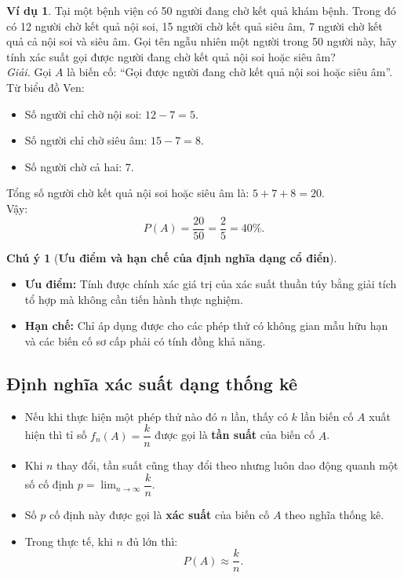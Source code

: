 \documentclass[12pt,a4paper]{article}
\theoremstyle{definition}
\newtheorem{vidu}{Ví dụ}[section]
\newtheorem{chuy}{Chú ý}[section]
\begin{document}
\begin{vidu}
Tại một bệnh viện có 50 người đang chờ kết quả khám bệnh. Trong đó có 12 người chờ kết quả nội soi, 15 người chờ kết quả siêu âm, 7 người chờ kết quả cả nội soi và siêu âm. Gọi tên ngẫu nhiên một người trong 50 người này, hãy tính xác suất gọi được người đang chờ kết quả nội soi hoặc siêu âm?\\
\textit{Giải.} Gọi $A$ là biến cố: ``Gọi được người đang chờ kết quả nội soi hoặc siêu âm''.
Từ biểu đồ Ven:
\begin{itemize}
    \item Số người chỉ chờ nội soi: $12 - 7 = 5$.
    \item Số người chỉ chờ siêu âm: $15 - 7 = 8$.
    \item Số người chờ cả hai: $7$.
\end{itemize}
Tổng số người chờ kết quả nội soi hoặc siêu âm là: $5 + 7 + 8 = 20$.\\
Vậy:
\[
P(A) = \frac{20}{50} = \frac{2}{5} = 40\%.
\]
\end{vidu}

\begin{chuy}[\textbf{Ưu điểm và hạn chế của định nghĩa dạng cổ điển}]
\begin{itemize}
    \item \textbf{Ưu điểm:} Tính được chính xác giá trị của xác suất thuần túy bằng giải tích tổ hợp mà không cần tiến hành thực nghiệm.
    \item \textbf{Hạn chế:} Chỉ áp dụng được cho các phép thử có không gian mẫu hữu hạn và các biến cố sơ cấp phải có tính đồng khả năng.
\end{itemize}
\end{chuy}

\subsection{Định nghĩa xác suất dạng thống kê}
\begin{itemize}[leftmargin=1.5em]
    \item Nếu khi thực hiện một phép thử nào đó $n$ lần, thấy có $k$ lần biến cố $A$ xuất hiện thì tỉ số $f_n(A) = \dfrac{k}{n}$ được gọi là \textbf{tần suất} của biến cố $A$.
    \item Khi $n$ thay đổi, tần suất cũng thay đổi theo nhưng luôn dao động quanh một số cố định $p = \lim_{n \to \infty} \dfrac{k}{n}$.
    \item Số $p$ cố định này được gọi là \textbf{xác suất} của biến cố $A$ theo nghĩa thống kê.
    \item Trong thực tế, khi $n$ đủ lớn thì:
    \[
    P(A) \approx \frac{k}{n}.
    \]
\end{itemize}
\end{document}
